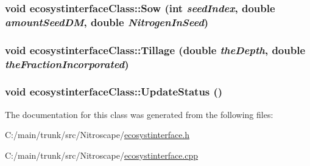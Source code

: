 \label{classecosystinterface_class_a5a695a80d79051c490b3b9d780361c33}
\hypertarget{classecosystinterface_class_a0b3e023f30976c4ff7d923c8a176880b}{
\subsubsection[{Sow}]{\setlength{\rightskip}{0pt plus 5cm}void ecosystinterfaceClass::Sow (int {\em seedIndex}, \/  double {\em amountSeedDM}, \/  double {\em NitrogenInSeed})}}
\label{classecosystinterface_class_a0b3e023f30976c4ff7d923c8a176880b}
\hypertarget{classecosystinterface_class_adbbd88e1379ddc5479821491d0bd06ed}{
\subsubsection[{Tillage}]{\setlength{\rightskip}{0pt plus 5cm}void ecosystinterfaceClass::Tillage (double {\em theDepth}, \/  double {\em theFractionIncorporated})}}
\label{classecosystinterface_class_adbbd88e1379ddc5479821491d0bd06ed}
\hypertarget{classecosystinterface_class_a2b6e0ede9e2cbeb64b5fd46a751aff17}{
\subsubsection[{UpdateStatus}]{\setlength{\rightskip}{0pt plus 5cm}void ecosystinterfaceClass::UpdateStatus ()}}
\label{classecosystinterface_class_a2b6e0ede9e2cbeb64b5fd46a751aff17}


The documentation for this class was generated from the following files:\begin{DoxyCompactItemize}
\item 
C:/main/trunk/src/Nitroscape/\hyperlink{ecosystinterface_8h}{ecosystinterface.h}\item 
C:/main/trunk/src/Nitroscape/\hyperlink{ecosystinterface_8cpp}{ecosystinterface.cpp}\end{DoxyCompactItemize}
